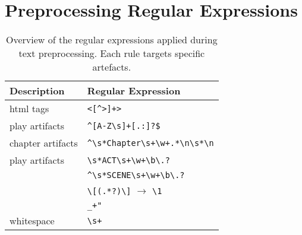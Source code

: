 
\chapter{Preprocessing Regular Expressions}
\label{app:regex_preproc}

\begin{table}[H]%
  \caption[Regular expressions applied during text preprocessing.]{Overview of the regular expressions applied during text preprocessing. 
            Each rule targets specific artefacts.}
  \label{tab:regex}%
  \centering\small
  \begin{tabular}{@{}ll@{}} %
    \toprule
    \textbf{Description} & \textbf{Regular Expression}  \\
    \midrule
            html tags             & \verb|<[^>]+>| \\
            play artifacts        & \verb|^[A-Z\s]+[.:]?$| \\
            chapter artifacts     & \verb|^\s*Chapter\s+\w+.*\n\s*\n| \\
            play artifacts        & \verb|\s*ACT\s+\w+\b\.?| \\
                                  & \verb|^\s*SCENE\s+\w+\b\.?| \\
                                  & \verb|\[(.*?)\]| $\rightarrow$ \verb|\1| \\
                                  & \verb|_+"| \\
            whitespace           & \verb|\s+| \\


    \bottomrule
  \end{tabular}
\end{table}
